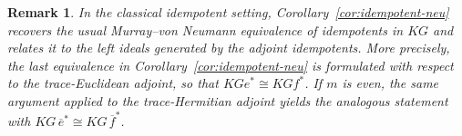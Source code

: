 \documentclass[11pt]{article}
\newtheorem{remark}[theorem]{Remark}
\begin{document}

\begin{remark}

In the classical idempotent setting, Corollary~\ref{cor:idempotent-neu} recovers the usual Murray--von Neumann equivalence of idempotents in $KG$ and relates it to the left ideals generated by the adjoint idempotents. More precisely, the last equivalence in Corollary~\ref{cor:idempotent-neu} is formulated with respect to the trace-Euclidean adjoint, so that $KGe^\ast\cong KGf^\ast$. If $m$ is even, the same argument applied to the trace-Hermitian adjoint yields the analogous statement with $KG\,\overline e^\ast\cong KG\,\overline f^\ast$.

\end{remark}


\end{document}
